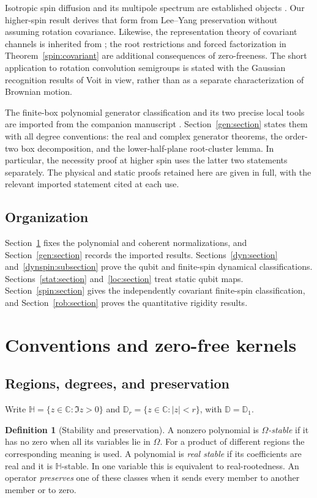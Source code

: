 \documentclass[reqno]{amsart}
\theoremstyle{definition}
\newtheorem{definition}[theorem]{Definition}
\theoremstyle{remark}
\newcommand{\C}{\mathbb C}
\newcommand{\D}{\mathbb D}
\newcommand{\HH}{\mathbb H}
\begin{document}
Isotropic spin diffusion and its multipole spectrum are established
objects \cite{DenisMartin22,FilippovKuzhamuratova19}. Our higher-spin
result derives that form from Lee--Yang preservation without assuming
rotation covariance. Likewise, the representation theory of covariant
channels is inherited from \cite{AlNuwairan14,ARS24}; the root restrictions
and forced factorization in Theorem~\ref{spin:covariant} are additional
consequences of zero-freeness. The short application to rotation
convolution semigroups is stated with the Gaussian recognition results
of Voit \cite{Voit03} in view, rather than as a separate characterization
of Brownian motion.

The finite-box polynomial generator classification and its two precise
local tools are imported from the companion manuscript
\cite{WeiGenerators2026}. Section~\ref{gen:section} states them with
all degree conventions: the real and complex generator theorems,
the order-two box decomposition, and the lower-half-plane root-cluster
lemma. In particular, the necessity proof at higher spin uses the latter
two statements separately. The physical and static proofs retained here
are given in full, with the relevant imported statement cited at each use.

\subsection*{Organization}
Section~\ref{pre:section} fixes the polynomial and coherent normalizations,
and Section~\ref{gen:section} records the imported results.
Sections~\ref{dyn:section} and~\ref{dynspin:subsection} prove the
qubit and finite-spin dynamical classifications.
Sections~\ref{stat:section} and~\ref{loc:section} treat static qubit maps.
Section~\ref{spin:section} gives the independently covariant finite-spin
classification, and Section~\ref{rob:section} proves the quantitative
rigidity results.


\section{Conventions and zero-free kernels}\label{pre:section}

\subsection{Regions, degrees, and preservation}
Write $\HH=\{z\in\C:\Im z>0\}$ and $\D_r=\{z\in\C:|z|<r\}$,
with $\D=\D_1$.
\begin{definition}[Stability and preservation]\label{pre:stability}
A nonzero polynomial is \emph{$\Omega$-stable} if it
has no zero when all its variables lie in $\Omega$.
For a product of different regions the corresponding meaning is used.
A polynomial is \emph{real stable} if its coefficients are real and it is
$\HH$-stable. In one variable this is equivalent to real-rootedness.
An operator \emph{preserves} one of these classes when it sends every
member to another member or to zero.
\end{definition}
\end{document}
